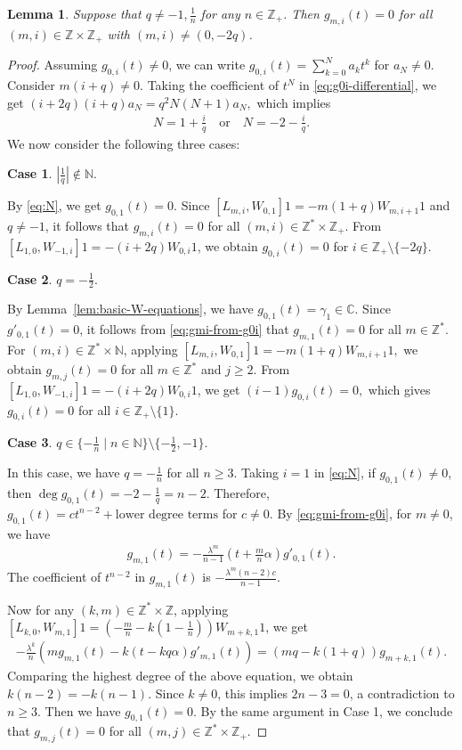 \documentclass[a4paper]{amsart}
\numberwithin{equation}{section}
\newtheorem{lemma}[theorem]{Lemma}
\begin{document}
\begin{lemma}\label{lem:ordinary-W-vanishing}
Suppose that $q\neq -1, \frac1n$ for any
$n\in\mathbb Z_{+}$. Then
$g_{m,i}(t)=0$
for all $(m,i)\in\mathbb Z\times\mathbb Z_{+}$ with $(m,i)\neq(0,-2q)$.
\end{lemma}
\begin{proof}
Assuming $g_{0,i}(t)\neq 0$, we can write
$
g_{0,i}(t)=\sum_{k=0}^{N}a_{k}t^k$ for  $a_N\neq0$.
Consider $m(i+q)\neq0$. Taking the coefficient of $t^N$ in \eqref{eq:g0i-differential}, we get
$
(i+2q)(i+q)a_N
=
q^2N(N+1)a_N,
$
which implies 
\begin{align}\label{eq:N}
    N=1+\frac{i}{q}
\quad\text{or}\quad
N=-2-\frac{i}{q}.
\end{align}
We now consider the following three cases:

{\bf Case 1}.  $|\frac{1}{q}|\notin \mathbb{N}$.

By \eqref{eq:N}, we get $g_{0,1}(t)=0$. Since $[L_{m,i},W_{0,1}] 1=-m(1+q)W_{m,i+1} 1$ and $q\neq -1$, it follows that $g_{m,i}(t)=0$ for all $(m,i)\in \mathbb{Z}^{*}\times\mathbb Z_{+}$. From $[L_{1,0},W_{-1,i}] 1=-(i+2q)W_{0,i} 1$, we obtain $g_{0,i}(t)=0$ for $i\in\mathbb Z_{+}\setminus\{-2q\}$.


{\bf Case 2}. $q=-\frac{1}{2}$.

By Lemma~\ref{lem:basic-W-equations}, we have
$g_{0,1}(t)=\gamma_1\in\mathbb C.$
Since $g'_{0,1}(t)=0$, it follows from
\eqref{eq:gmi-from-g0i} that
$g_{m,1}(t)=0$
for all $m\in\mathbb Z^*$.
For   $(m,i)\in\mathbb Z^*\times\mathbb N$, applying
$[L_{m,i},W_{0,1}]1=-m(1+q)W_{m,i+1}1,$
we obtain
$g_{m,j}(t)=0$ for all $m\in\mathbb Z^*$ and $j\geq2$.
From
$[L_{1,0},W_{-1,i}]1=-(i+2q)W_{0,i}1$,
we get
$(i-1)g_{0,i}(t)=0,$
which gives 
$g_{0,i}(t)=0$
for all $i\in\mathbb{Z}_{+}\setminus\{1\}$.

{\bf Case 3}. $q\in \{-\frac{1}{n}\mid n\in\mathbb{N}\} \setminus \{-\frac{1}{2},-1\}$.

In this case, we have $q=-\frac1n$ for all $n\geq3$.
Taking $i=1$ in \eqref{eq:N}, if $g_{0,1}(t)\neq0$, then
$
\deg g_{0,1}(t)=-2-\frac1q=n-2.
$
Therefore,
$
g_{0,1}(t)=ct^{n-2}+\text{lower degree terms}$ 
for $c\neq0.$
By \eqref{eq:gmi-from-g0i}, for $m\neq0$, we have
\begin{align*}
g_{m,1}(t)
=
-\frac{\lambda^m}{n-1}(t+\frac mn\alpha)g'_{0,1}(t).
\end{align*}
The coefficient of $t^{n-2}$ in $g_{m,1}(t)$ is
$-\frac{\lambda^m(n-2)c}{n-1}.$

Now for any $(k,m)\in \mathbb{Z}^*\times\mathbb{Z}$, applying 
$[L_{k,0},W_{m,1}]1
=
\left(-\frac{m}{n}-k(1-\frac{1}{n})\right)W_{m+k,1}1$,
 we get
\begin{align*}
 -\frac{\lambda^k}{n}\left(mg_{m,1}(t)-k(t-kq\alpha)g'_{m,1}(t)\right)
=
\left(mq-k(1+q)\right)g_{m+k,1}(t).
\end{align*}
Comparing the highest degree   of the above equation, we obtain
$k(n-2)=-k(n-1).$
Since $k\neq0$, this implies $2n-3=0$, a contradiction to $n\geq3$. Then we have
$g_{0,1}(t)=0.$
By the same argument   in Case 1, 
we conclude that 
$g_{m,j}(t)=0$
for all $(m,j)\in\mathbb Z^*\times\mathbb Z_{+}$.
 

\end{proof}
\end{document}
